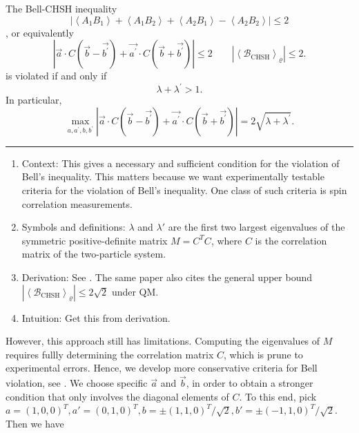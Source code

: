 \begin{tcolorbox}[breakable,colback=cyan!10,title=Bell Inequality Violation]
    The Bell-CHSH inequality
    \[
        \left|\left\langle A_{1} B_{1}\right\rangle+\left\langle A_{1} B_{2}\right\rangle+\left\langle A_{2} B_{1}\right\rangle-\left\langle A_{2} B_{2}\right\rangle\right| \leq 2
    \], or equivalently
    \[
    \left|\vec{a} \cdot C\left(\vec{b}-\vec{b^{\prime}}\right)+\vec{a^{\prime}} \cdot C\left(\vec{b}+\vec{b^{\prime}}\right)\right| \leq 2 \qquad \left|\left\langle\mathcal{B}_{\mathrm{CHSH}}\right\rangle_\varrho\right| \leq 2.
    \]
    is violated if and only if
    \[
        \lambda+\lambda^{\prime}>1
    .\]
    In particular,
    \[
\max _{a, a^{\prime}, b, b^{\prime}}\left|\vec{a} \cdot C\left(\vec{b}-\vec{b^{\prime}}\right)+\vec{a^{\prime}} \cdot C\left(\vec{b}+\vec{b^{\prime}}\right)\right|=2 \sqrt{\lambda+\lambda^{\prime}}.
\]
    \rule{\linewidth}{0.1em}
    \begin{enumerate}[leftmargin=!,labelindent=!,itemindent=-15pt]
        \item Context: This gives a necessary and sufficient condition for the violation of Bell's inequality. This matters because we want experimentally testable criteria for the violation of Bell's inequality. One class of such criteria is spin correlation measurements. 
        \item Symbols and definitions: $\lambda$ and $\lambda'$ are the first two largest eigenvalues of the symmetric positive-definite matrix $M = C^T C$, where $C$ is the correlation matrix of the two-particle system.
        \item Derivation: See \autocite[eqn.~6-9]{horodeckiViolatingBell1995}. The same paper also cites the general upper bound $\left|\left\langle\mathcal{B}_{\mathrm{CHSH}}\right\rangle_\varrho\right| \leq 2 \sqrt{2}$ under QM.
        \item Intuition: \followup Get this from derivation.
    \end{enumerate}
\end{tcolorbox}
However, this approach still has limitations. Computing the eigenvalues of $M$ requires fullly determining the correlation matrix $C$, which is prune to experimental errors. Hence, we develop more conservative criteria for Bell violation, see \autocite[eqn.~15-17]{aguilar-saavedraImprovedTests2022}. We choose specific $\vec a$ and $\vec b$, in order to obtain a stronger condition that only involves the diagonal elements of $C$. To this end, pick $a = (1,0,0)^T, a' = (0,1,0)^T, b = \pm(1,1,0)^T/\sqrt{2}, b' = \pm (-1, 1, 0)^T/\sqrt{2}$. Then we have
